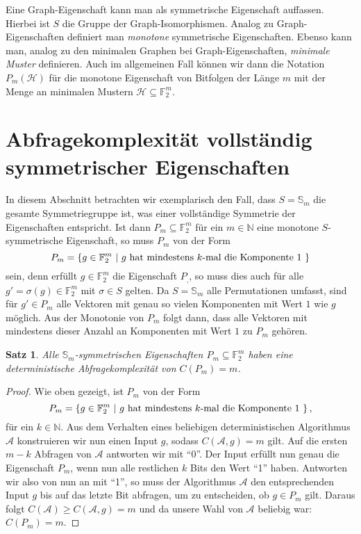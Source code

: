 \documentclass[10pt,a4paper, footheight=1mm]{scrreprt}
\newtheorem{Satz}[definition]{Satz}
\theoremstyle{definition}
\begin{document}
Eine Graph-Eigenschaft kann man als symmetrische
Eigenschaft auffassen. Hierbei ist $S$ die Gruppe
der Graph-Isomorphismen.
Analog zu Graph-Eigenschaften definiert man
\emph{monotone} symmetrische Eigenschaften. 
Ebenso kann man, analog zu den minimalen Graphen bei
Graph-Eigenschaften, \emph{minimale Muster} definieren.
Auch im allgemeinen Fall können wir dann die Notation
$P_m(\mathcal{H})$ für die monotone Eigenschaft
von Bitfolgen der Länge $m$ mit der Menge an minimalen
Mustern $\mathcal{H}\subseteq \mathbb{F}_2^m$.

\section{Abfragekomplexität vollständig symmetrischer Eigenschaften}
In diesem Abschnitt betrachten wir exemplarisch
den Fall, dass $S=\mathbb{S}_m$ die gesamte Symmetriegruppe
ist, was einer vollständige Symmetrie der Eigenschaften entspricht.
Ist dann $P_m\subseteq \mathbb{F}_2^m$ für ein $m\in\mathbb{N}$ eine monotone 
$S$-symmetrische Eigenschaft, so muss 
$P_m$ von der Form 
$$ P_m= \{ g\in \mathbb{F}_2^m \ |
\ g \textup{ hat mindestens } k\textup{-mal die Komponente } 1 \ \}$$
sein, denn erfüllt $g\in \mathbb{F}_2^m$ die Eigenschaft
$P_,$, so muss dies auch für alle $g'=\sigma(g)\in\mathbb{F}_2^m$
mit $\sigma\in S$ gelten. Da $S=\mathbb{S}_m$ alle Permutationen
umfasst, sind für $g'\in P_m$ alle Vektoren mit
genau so vielen Komponenten mit Wert $1$ wie $g$ möglich. Aus der
Monotonie von $P_m$ folgt dann, dass alle Vektoren mit
mindestens dieser Anzahl an Komponenten mit Wert $1$ zu
$P_m$ gehören.
\begin{Satz}
\label{thm:SymmetrischeGruppe}
Alle $\mathbb{S}_m$-symmetrischen Eigenschaften 
$P_m \subseteq \mathbb{F}_2^m$ haben eine
deterministische Abfragekomplexität
von $C(P_m) = m$.
\end{Satz}
\begin{proof}
Wie oben gezeigt, ist $P_m$ von der Form
$$ P_m= \{ g\in \mathbb{F}_2^m \ |
\ g \textup{ hat mindestens } k\textup{-mal die Komponente } 1 \ \}\,,$$
für ein $k\in \mathbb{N}$.
Aus dem Verhalten eines beliebigen deterministischen Algorithmus
$\mathcal{A}$ konstruieren wir nun einen Input $g$,
sodass $C(\mathcal{A},g)=m$ gilt. Auf die ersten $m-k$
Abfragen von $\mathcal{A}$ antworten wir mit "`0"'.
Der Input erfüllt nun genau die Eigenschaft $P_m$, wenn
nun alle restlichen $k$ Bits den Wert "`1"' haben.
Antworten wir also von nun an mit "`1"', so muss der 
Algorithmus $\mathcal{A}$
den entsprechenden Input $g$ bis auf das letzte Bit abfragen,
um zu entscheiden, ob $g\in P_m$ gilt. Daraus folgt
$C(\mathcal{A}) \geq C(\mathcal{A}, g) = m$ und da unsere
Wahl von $\mathcal{A}$ beliebig war: $C(P_m)=m$.
\end{proof}
\end{document}
